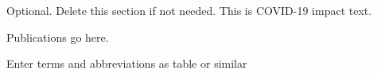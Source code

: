 %







\begin{uomcovid} %
  Optional. Delete this section if not needed. This is COVID-19 impact text.
  
  \lipsum[1-3] %
\end{uomcovid}%




\makeatletter
\title{\xmp@Title}
\author{\xmp@Author}
\makeatother

\maketitle




\uomtoc %
\uomlof %
\uomlot %
\begin{uomlop} %
  Publications go here.
\end{uomlop}
\begin{uomterms}
  Enter terms and abbreviations as table or similar
\end{uomterms}



